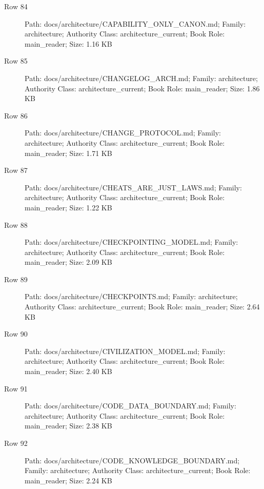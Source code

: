 \documentclass[9pt,a4paper]{book}
\begin{document}
\begin{description}
\item[Row 84] Path: docs/\allowbreak{}architecture/\allowbreak{}CAPABILITY\_\allowbreak{}ONLY\_\allowbreak{}CANON.\allowbreak{}md; Family: architecture; Authority Class: architecture\_\allowbreak{}current; Book Role: main\_\allowbreak{}reader; Size: 1.\allowbreak{}16 KB
\item[Row 85] Path: docs/\allowbreak{}architecture/\allowbreak{}CHANGELOG\_\allowbreak{}ARCH.\allowbreak{}md; Family: architecture; Authority Class: architecture\_\allowbreak{}current; Book Role: main\_\allowbreak{}reader; Size: 1.\allowbreak{}86 KB
\item[Row 86] Path: docs/\allowbreak{}architecture/\allowbreak{}CHANGE\_\allowbreak{}PROTOCOL.\allowbreak{}md; Family: architecture; Authority Class: architecture\_\allowbreak{}current; Book Role: main\_\allowbreak{}reader; Size: 1.\allowbreak{}71 KB
\item[Row 87] Path: docs/\allowbreak{}architecture/\allowbreak{}CHEATS\_\allowbreak{}ARE\_\allowbreak{}JUST\_\allowbreak{}LAWS.\allowbreak{}md; Family: architecture; Authority Class: architecture\_\allowbreak{}current; Book Role: main\_\allowbreak{}reader; Size: 1.\allowbreak{}22 KB
\item[Row 88] Path: docs/\allowbreak{}architecture/\allowbreak{}CHECKPOINTING\_\allowbreak{}MODEL.\allowbreak{}md; Family: architecture; Authority Class: architecture\_\allowbreak{}current; Book Role: main\_\allowbreak{}reader; Size: 2.\allowbreak{}09 KB
\item[Row 89] Path: docs/\allowbreak{}architecture/\allowbreak{}CHECKPOINTS.\allowbreak{}md; Family: architecture; Authority Class: architecture\_\allowbreak{}current; Book Role: main\_\allowbreak{}reader; Size: 2.\allowbreak{}64 KB
\item[Row 90] Path: docs/\allowbreak{}architecture/\allowbreak{}CIVILIZATION\_\allowbreak{}MODEL.\allowbreak{}md; Family: architecture; Authority Class: architecture\_\allowbreak{}current; Book Role: main\_\allowbreak{}reader; Size: 2.\allowbreak{}40 KB
\item[Row 91] Path: docs/\allowbreak{}architecture/\allowbreak{}CODE\_\allowbreak{}DATA\_\allowbreak{}BOUNDARY.\allowbreak{}md; Family: architecture; Authority Class: architecture\_\allowbreak{}current; Book Role: main\_\allowbreak{}reader; Size: 2.\allowbreak{}38 KB
\item[Row 92] Path: docs/\allowbreak{}architecture/\allowbreak{}CODE\_\allowbreak{}KNOWLEDGE\_\allowbreak{}BOUNDARY.\allowbreak{}md; Family: architecture; Authority Class: architecture\_\allowbreak{}current; Book Role: main\_\allowbreak{}reader; Size: 2.\allowbreak{}24 KB

\end{description}
\end{document}
